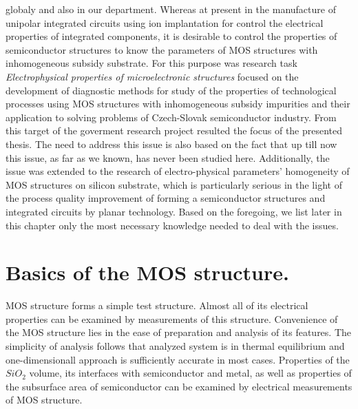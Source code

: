 globaly and also in our department. Whereas at present in the
manufacture of unipolar integrated circuits using ion implantation for
control the electrical properties of integrated components, it is
desirable to control the properties of semiconductor structures to
know the parameters of MOS structures with inhomogeneous subsidy
substrate. For this purpose was research task {\em Electrophysical
  properties of microelectronic structures} \cite{1.3,1.4} focused on
the development of diagnostic methods for study of the properties of
technological processes using MOS structures with inhomogeneous
subsidy impurities and their application to solving problems of
Czech-Slovak semiconductor industry. From this target of the goverment
research project resulted the focus of the presented thesis. The need
to address this issue is also based on the fact that up till now this
issue, as far as we known, has never been studied here. Additionally,
the issue was extended to the research of electro-physical parameters'
homogeneity of MOS structures on silicon substrate, which is
particularly serious in the light of the process quality improvement
of forming a semiconductor structures and integrated circuits by
planar technology. Based on the foregoing, we list later in this
chapter only the most necessary knowledge needed to deal with the
issues.

\iffalse
\section{Základné poznatky o štruktúre MOS.}
Štruktúra MOS tvorí jednoduchú testovaciu štruktúru, ktorej meraním
možno skúmať skoro všetky jej elektrické vlastnosti. Výhodnosť
štruktúry MOS spočíva v jednoduchosti jej výroby a jednoduchosti
analýzy jej vlastností. Jednoduchosť analýzy vyplýva z toho, že
analyzovaný systém je v tepelnej rovnováhe a zároveň
jednodimenzionálny prístup je pre väčšinu javov dostatočne
presný. Elektrickými meraniami štruktúry MOS možno skúmať vlastnosti
objemu $SiO_2$, jeho rozhrania s polovodičom a kovom, ako aj
vlastnosti podpovrchovej oblasti polovodiča.
\fi
\section{Basics of the MOS structure.}
MOS structure forms a simple test structure. Almost all of its
electrical properties can be examined by measurements of this
structure. Convenience of the MOS structure lies in the ease of
preparation and analysis of its features. The simplicity of analysis
follows that analyzed system is in thermal equilibrium and
one-dimensionall approach is sufficiently accurate in most
cases. Properties of the $SiO_2$ volume, its interfaces with
semiconductor and metal, as well as properties of the subsurface
area of semiconductor can be examined by electrical measurements of
MOS structure.

